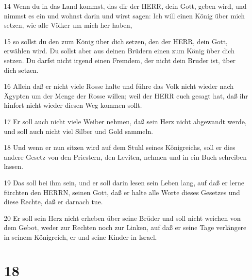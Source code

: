 \par 14 Wenn du in das Land kommst, das dir der HERR, dein Gott, geben wird, und nimmst es ein und wohnst darin und wirst sagen: Ich will einen König über mich setzen, wie alle Völker um mich her haben,
\par 15 so sollst du den zum König über dich setzen, den der HERR, dein Gott, erwählen wird. Du sollst aber aus deinen Brüdern einen zum König über dich setzen. Du darfst nicht irgend einen Fremdem, der nicht dein Bruder ist, über dich setzen.
\par 16 Allein daß er nicht viele Rosse halte und führe das Volk nicht wieder nach Ägypten um der Menge der Rosse willen; weil der HERR euch gesagt hat, daß ihr hinfort nicht wieder diesen Weg kommen sollt.
\par 17 Er soll auch nicht viele Weiber nehmen, daß sein Herz nicht abgewandt werde, und soll auch nicht viel Silber und Gold sammeln.
\par 18 Und wenn er nun sitzen wird auf dem Stuhl seines Königreichs, soll er dies andere Gesetz von den Priestern, den Leviten, nehmen und in ein Buch schreiben lassen.
\par 19 Das soll bei ihm sein, und er soll darin lesen sein Leben lang, auf daß er lerne fürchten den HERRN, seinen Gott, daß er halte alle Worte dieses Gesetzes und diese Rechte, daß er darnach tue.
\par 20 Er soll sein Herz nicht erheben über seine Brüder und soll nicht weichen von dem Gebot, weder zur Rechten noch zur Linken, auf daß er seine Tage verlängere in seinem Königreich, er und seine Kinder in Israel.

\chapter{18}

